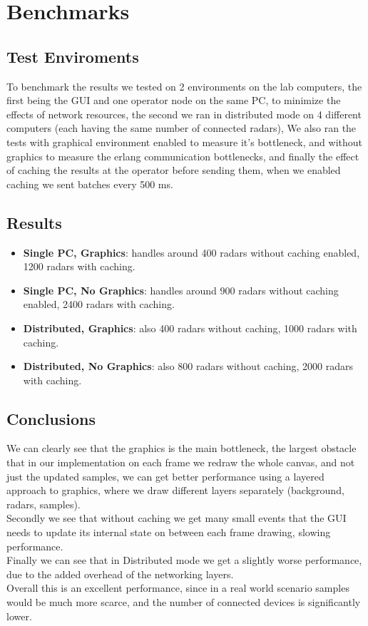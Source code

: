 \documentclass{article}
\begin{document}
\newpage
\section{Benchmarks}
\subsection{Test Enviroments}
To benchmark the results we tested on 2 environments on the lab computers, the first being the GUI and one operator node on the same PC, to minimize the effects of network resources, the second we ran in distributed mode on 4 different computers (each having the same number of connected radars), We also ran the tests with graphical environment enabled to measure it's bottleneck, and without graphics to measure the erlang communication bottlenecks, and finally the effect of caching the results at the operator before sending them, when we enabled caching we sent batches every 500 ms.
\subsection{Results}
\begin{itemize}
    \item \textbf{Single PC, Graphics}: handles around 400 radars without caching enabled, 1200 radars with caching.
    \item \textbf{Single PC, No Graphics}: handles around 900 radars without caching enabled, 2400 radars with caching.
    \item \textbf{Distributed, Graphics}: also 400 radars without caching, 1000 radars with caching.
    \item \textbf{Distributed, No Graphics}: also 800 radars without caching, 2000 radars with caching.
\end{itemize}

\subsection{Conclusions}
We can clearly see that the graphics is the main bottleneck, the largest obstacle that in our implementation on each frame we redraw the whole canvas, and not just the updated samples, we can get better performance using a layered approach to graphics, where we draw different layers separately (background, radars, samples).\\
Secondly we see that without caching we get many small events that the GUI needs to update its internal state on between each frame drawing, slowing performance.\\
Finally we can see that in Distributed mode we get a slightly worse performance, due to the added overhead of the networking layers.\\
Overall this is an excellent performance, since in a real world scenario samples would be much more scarce, and the number of connected devices is significantly lower.
\end{document}
